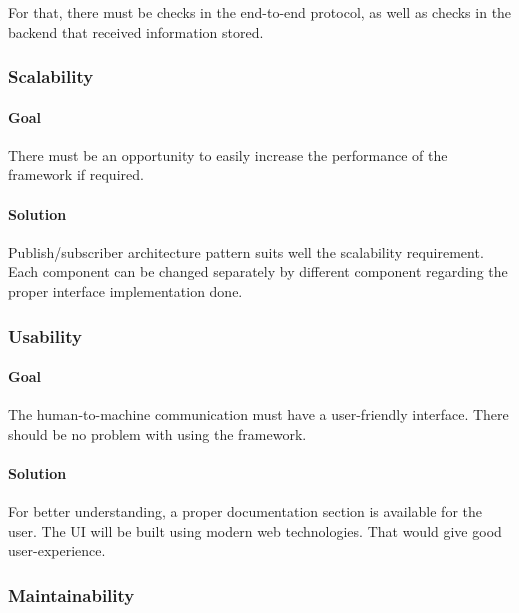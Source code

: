 For that, there must be checks in the end-to-end protocol, as well as
checks in the backend that received information stored.

\subsubsection{Scalability}\label{scalability}

\paragraph{Goal}\label{goal-2}

There must be an opportunity to easily increase the performance of the
framework if required.

\paragraph{Solution}\label{solution-2}

Publish/subscriber architecture pattern suits well the scalability
requirement. Each component can be changed separately by different
component regarding the proper interface implementation done.

\subsubsection{Usability}\label{usability}

\paragraph{Goal}\label{goal-3}

The human-to-machine communication must have a user-friendly interface.
There should be no problem with using the framework.

\paragraph{Solution}\label{solution-3}

For better understanding, a proper documentation section is available
for the user. The UI will be built using modern web technologies. That
would give good user-experience.

\subsubsection{Maintainability}\label{maintainability}

